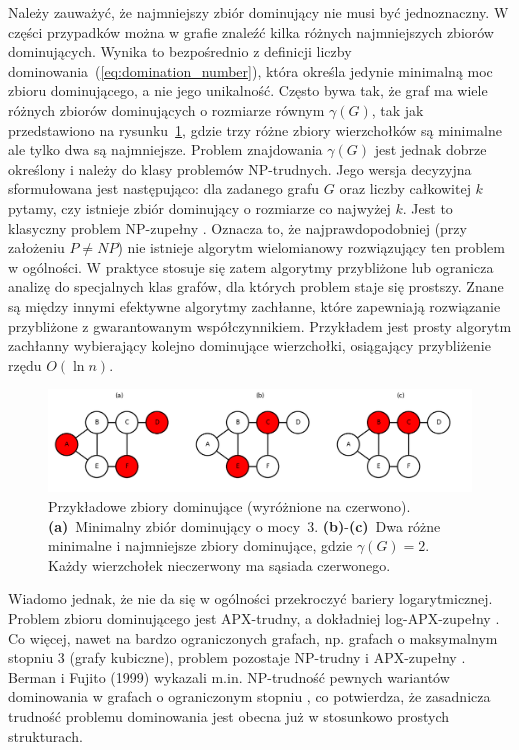 Należy zauważyć, że najmniejszy zbiór dominujący nie musi być jednoznaczny.
W części przypadków można w grafie znaleźć kilka różnych najmniejszych zbiorów dominujących.
Wynika to bezpośrednio z definicji liczby dominowania~(\ref{eq:domination_number}),
która określa jedynie minimalną moc zbioru dominującego, a nie jego unikalność.
Często bywa tak, że graf ma wiele różnych zbiorów dominujących o rozmiarze równym $\gamma(G)$,
tak jak przedstawiono na rysunku~\ref{fig:dominatingexample}, gdzie trzy różne zbiory wierzchołków są minimalne ale tylko dwa są najmniejsze.
Problem znajdowania $\gamma(G)$ jest jednak dobrze określony i należy do klasy problemów NP-trudnych. Jego wersja decyzyjna sformułowana jest następująco: dla zadanego grafu $G$ oraz liczby całkowitej $k$ pytamy, czy istnieje zbiór dominujący o rozmiarze co najwyżej $k$. Jest to klasyczny problem NP-zupełny \cite{wikiDominatingSet, POUREIDI2023106363, PANDA2023337}. Oznacza to, że najprawdopodobniej (przy założeniu $P \neq NP$) nie istnieje algorytm wielomianowy rozwiązujący ten problem w ogólności. W praktyce stosuje się zatem algorytmy przybliżone lub ogranicza analizę do specjalnych klas grafów, dla których problem staje się prostszy. Znane są między innymi efektywne algorytmy zachłanne, które zapewniają rozwiązanie przybliżone z gwarantowanym współczynnikiem. Przykładem jest prosty algorytm zachłanny wybierający kolejno dominujące wierzchołki, osiągający przybliżenie rzędu $O(\ln n)$.


\begin{figure}[H]
  \centering
  \includegraphics[width=1\textwidth]{assets/dominating-set-example.png}
  \caption[Przykładowe zbiory dominujące]{%
    Przykładowe zbiory dominujące (wyróżnione na czerwono).
    \textbf{(a)}~Minimalny zbiór dominujący o mocy~3.
    \textbf{(b)}-\textbf{(c)}~Dwa różne minimalne i najmniejsze zbiory dominujące, gdzie
    \(\gamma(G)=2\).  Każdy wierzchołek nieczerwony ma sąsiada czerwonego.
  }
  \label{fig:dominatingexample}
\end{figure}

Wiadomo jednak, że nie da się w ogólności przekroczyć bariery logarytmicznej. Problem zbioru dominującego jest APX-trudny, a dokładniej log-APX-zupełny \cite{POUREIDI2023106363}. Co więcej, nawet na bardzo ograniczonych grafach, np. grafach o maksymalnym stopniu 3 (grafy kubiczne), problem pozostaje NP-trudny i APX-zupełny \cite{ALIMONTI2000123}. Berman i Fujito (1999) wykazali m.in. NP-trudność pewnych wariantów dominowania w grafach o ograniczonym stopniu \cite{BermanFujitoThreeDegree}, co potwierdza, że zasadnicza trudność problemu dominowania jest obecna już w stosunkowo prostych strukturach.


